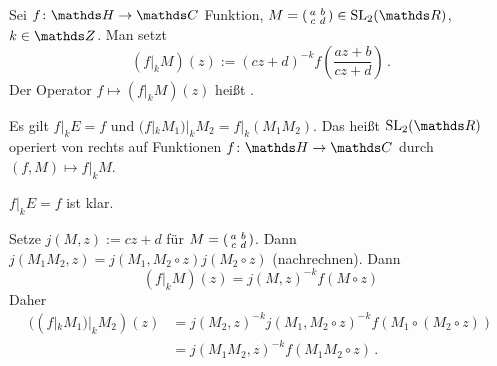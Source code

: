 \begin{defi}
Sei $f\colon \HH \ra \CC$ Funktion, $M = \abcd \in \SL_2(\RR)$, $k\in\ZZ$.
Man setzt
\[
    (f|_k M)(z) := (cz+d)^{-k} f\left(\frac{az+b}{cz+d}\right)
    \,.
\]
Der Operator $f \mapsto (f|_k M)(z)$ heißt .
\end{defi}

\begin{lemm}
Es gilt $f|_kE = f$ und $(f|_kM_1)|_kM_2 = f|_k(M_1M_2)$.
Das heißt $\SL_2(\RR)$ operiert von rechts auf Funktionen $f\colon \HH \ra \CC$ durch $(f, M) \mapsto f|_k M$.
\end{lemm}

\begin{bewe}
$f|_kE = f$ ist klar.

Setze $j(M, z) := cz+d$ für $M = \abcd$.
Dann $j(M_1M_2, z) = j(M_1, M_2 \circ z) j(M_2 \circ z)$ (nachrechnen).
Dann
\[
    (f|_kM)(z) = j(M,z)^{-k}f(M \circ z)
\]
Daher
\begin{align*}
    ((f|_kM_1)|_kM_2)(z)
    &= j(M_2, z)^{-k}j(M_1, M_2\circ z)^{-k} f(M_1 \circ (M_2 \circ z)) \\
    &= j(M_1M_2, z)^{-k}f(M_1M_2 \circ z)
    \,.
\end{align*}
\end{bewe}